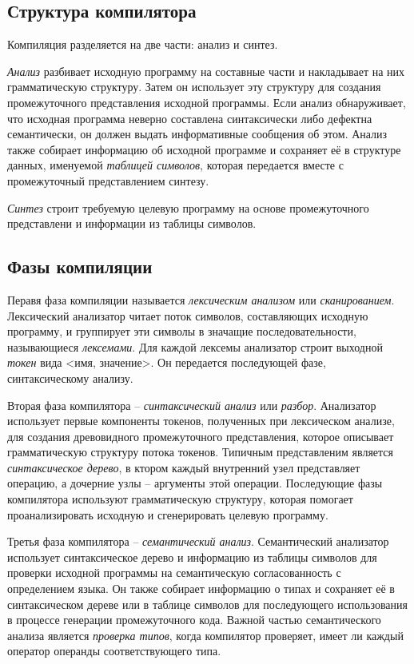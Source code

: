 \documentclass[a4paper,12pt]{article}
\begin{document}
\subsection{Структура компилятора}
Компиляция разделяется на две части: анализ и синтез.

\textit{Анализ} разбивает исходную программу на составные части и накладывает на них грамматическую структуру. Затем он использует эту структуру для создания промежуточного представления исходной программы. Если анализ обнаруживает, что исходная программа неверно составлена синтаксически либо дефектна семантически, он должен выдать информативные сообщения об этом. Анализ также собирает информацию об исходной программе и сохраняет её в структуре данных, именуемой \textit{таблицей символов}, которая передается вместе с промежуточный представлением синтезу.

\textit{Синтез} строит требуемую целевую программу на основе промежуточного представлени и информации из таблицы символов.

\subsection{Фазы компиляции}

Перавя фаза компиляции называется \textit{лексическим анализом} или \textit{сканированием}. Лексический анализатор читает поток символов, составляющих исходную программу, и группирует эти символы в значащие последовательности, называющиеся \textit{лексемами}. Для каждой лексемы анализатор строит выходной \textit{токен} вида <имя, значение>. Он передается последующей фазе, синтаксическому анализу.

Вторая фаза компилятора -- \textit{синтаксический анализ} или \textit{разбор}. Анализатор использует первые компоненты токенов, полученных при лексическом анализе, для создания древовидного промежуточного представления, которое описывает грамматическую структуру потока токенов. Типичным представленим является \textit{синтаксическое дерево}, в ктором каждый внутренний узел представляет операцию, а дочерние узлы -- аргументы этой операции. Последующие фазы компилятора используют грамматическую структуру, которая помогает проанализировать исходную и сгенерировать целевую программу.

Третья фаза компилятора -- \textit{семантический анализ}. Семантический анализатор использует синтаксическое дерево и информацию из таблицы символов для проверки исходной программы на семантическую согласованность с определением языка. Он также собирает информацию о типах и сохраняет её в синтаксическом дереве или в таблице символов для последующего использования в процессе генерации промежуточного кода. Важной частью семантического анализа является \textit{проверка типов}, когда компилятор проверяет, имеет ли каждый оператор операнды соответствующего типа.
\end{document}

